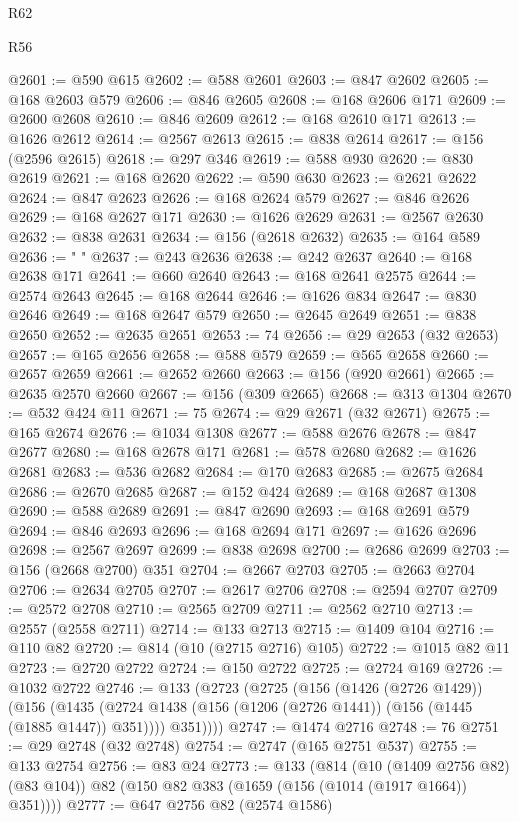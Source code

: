 \begin{lexlean}{R62}
\begin{lexlean}{R56}
\begin{coremodule}
{{{{{{{{{{{{{{{{{{{{{{{{{{{{{{{{{{{{{{{{{{{{{{{{{{{{{{{{{{{{{{{{{{{{{{{{{{{{{{{{{{{{{{{{{{{{{{{{{{{{{{{{{{{{{{{{{{{{{{{{{{{{{{{{{{{{{{{{{{{{{{{{{{{{{{{{{{{{{{{{{{{{{{{{{{{{{{{{{{{{{{{{{{{{{{{{{{{{{{{{{{{{{{{{{{{@2601 := @590 @615
@2602 := @588 @2601
@2603 := @847 @2602
@2605 := @168 @2603 @579
@2606 := @846 @2605
@2608 := @168 @2606 @171
@2609 := @2600 @2608
@2610 := @846 @2609
@2612 := @168 @2610 @171
@2613 := @1626 @2612
@2614 := @2567 @2613
@2615 := @838 @2614
@2617 := @156 (@2596 @2615)
@2618 := @297 @346
@2619 := @588 @930
@2620 := @830 @2619
@2621 := @168 @2620
@2622 := @590 @630
@2623 := @2621 @2622
@2624 := @847 @2623
@2626 := @168 @2624 @579
@2627 := @846 @2626
@2629 := @168 @2627 @171
@2630 := @1626 @2629
@2631 := @2567 @2630
@2632 := @838 @2631
@2634 := @156 (@2618 @2632)
@2635 := @164 @589
@2636 := " "
@2637 := @243 @2636
@2638 := @242 @2637
@2640 := @168 @2638 @171
@2641 := @660 @2640
@2643 := @168 @2641 @2575
@2644 := @2574 @2643
@2645 := @168 @2644
@2646 := @1626 @834
@2647 := @830 @2646
@2649 := @168 @2647 @579
@2650 := @2645 @2649
@2651 := @838 @2650
@2652 := @2635 @2651
@2653 := 74
@2656 := @29 @2653 (@32 @2653)
@2657 := @165 @2656
@2658 := @588 @579
@2659 := @565 @2658
@2660 := @2657 @2659
@2661 := @2652 @2660
@2663 := @156 (@920 @2661)
@2665 := @2635 @2570 @2660
@2667 := @156 (@309 @2665)
@2668 := @313 @1304
@2670 := @532 @424 @11
@2671 := 75
@2674 := @29 @2671 (@32 @2671)
@2675 := @165 @2674
@2676 := @1034 @1308
@2677 := @588 @2676
@2678 := @847 @2677
@2680 := @168 @2678 @171
@2681 := @578 @2680
@2682 := @1626 @2681
@2683 := @536 @2682
@2684 := @170 @2683
@2685 := @2675 @2684
@2686 := @2670 @2685
@2687 := @152 @424
@2689 := @168 @2687 @1308
@2690 := @588 @2689
@2691 := @847 @2690
@2693 := @168 @2691 @579
@2694 := @846 @2693
@2696 := @168 @2694 @171
@2697 := @1626 @2696
@2698 := @2567 @2697
@2699 := @838 @2698
@2700 := @2686 @2699
@2703 := @156 (@2668 @2700) @351
@2704 := @2667 @2703
@2705 := @2663 @2704
@2706 := @2634 @2705
@2707 := @2617 @2706
@2708 := @2594 @2707
@2709 := @2572 @2708
@2710 := @2565 @2709
@2711 := @2562 @2710
@2713 := @2557 (@2558 @2711)
@2714 := @133 @2713
@2715 := @1409 @104
@2716 := @110 @82
@2720 := @814 (@10 (@2715 @2716) @105)
@2722 := @1015 @82 @11
@2723 := @2720 @2722
@2724 := @150 @2722
@2725 := @2724 @169
@2726 := @1032 @2722
@2746 := @133
    (@2723
      (@2725
        (@156
          (@1426 (@2726 @1429))
          (@156
            (@1435 (@2724 @1438 (@156 (@1206 (@2726 @1441)) (@156 (@1445 (@1885 @1447)) @351))))
            @351))))
@2747 := @1474 @2716
@2748 := 76
@2751 := @29 @2748 (@32 @2748)
@2754 := @2747 (@165 @2751 @537)
@2755 := @133 @2754
@2756 := @83 @24
@2773 := @133
    (@814
      (@10 (@1409 @2756 @82) (@83 @104))
      @82
      (@150 @82 @383 (@1659 (@156 (@1014 (@1917 @1664)) @351))))
@2777 := @647 @2756 @82 (@2574 @1586)
}}}}}}}}}}}}}}}}}}}}}}}}}}}}}}}}}}}}}}}}}}}}}}}}}}}}}}}}}}}}}}}}}}}}}}}}}}}}}}}}}}}}}}}}}}}}}}}}}}}}}}}}}}}}}}}}}}}}}}}}}}}}}}}}}}}}}}}}}}}}}}}}}}}}}}}}}}}}}}}}}}}}}}}}}}}}}}}}}}}}}}}}}}}}}}}}}}}}}}}}}}}}}}}}}}}
\end{coremodule}
\end{lexlean}
\end{lexlean}
